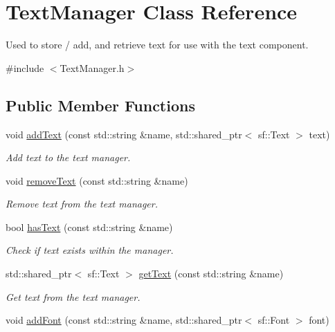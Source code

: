 \hypertarget{class_text_manager}{\section{Text\-Manager Class Reference}
\label{d1/d47/class_text_manager}
}


Used to store / add, and retrieve text for use with the text component.  




{\ttfamily \#include $<$Text\-Manager.\-h$>$}

\subsection*{Public Member Functions}
\begin{DoxyCompactItemize}
\item 
void \hyperlink{class_text_manager_ab1d27839da980b5334d66ba993a7778f}{add\-Text} (const std\-::string \&name, std\-::shared\-\_\-ptr$<$ sf\-::\-Text $>$ text)
\begin{DoxyCompactList}\small\item\em Add text to the text manager. \end{DoxyCompactList}\item 
void \hyperlink{class_text_manager_a302d75a4ccdca9b7ec3662ca898f31db}{remove\-Text} (const std\-::string \&name)
\begin{DoxyCompactList}\small\item\em Remove text from the text manager. \end{DoxyCompactList}\item 
bool \hyperlink{class_text_manager_a3a68a4a9c574ca5a56990208fcf268ec}{has\-Text} (const std\-::string \&name)
\begin{DoxyCompactList}\small\item\em Check if text exists within the manager. \end{DoxyCompactList}\item 
std\-::shared\-\_\-ptr$<$ sf\-::\-Text $>$ \hyperlink{class_text_manager_abb1b5688839e2da0a14e6c6527438b43}{get\-Text} (const std\-::string \&name)
\begin{DoxyCompactList}\small\item\em Get text from the text manager. \end{DoxyCompactList}\item 
void \hyperlink{class_text_manager_a3b899037ea5884e3cfe8b9dd8afd53f4}{add\-Font} (const std\-::string \&name, std\-::shared\-\_\-ptr$<$ sf\-::\-Font $>$ font)

\end{DoxyCompactItemize}

